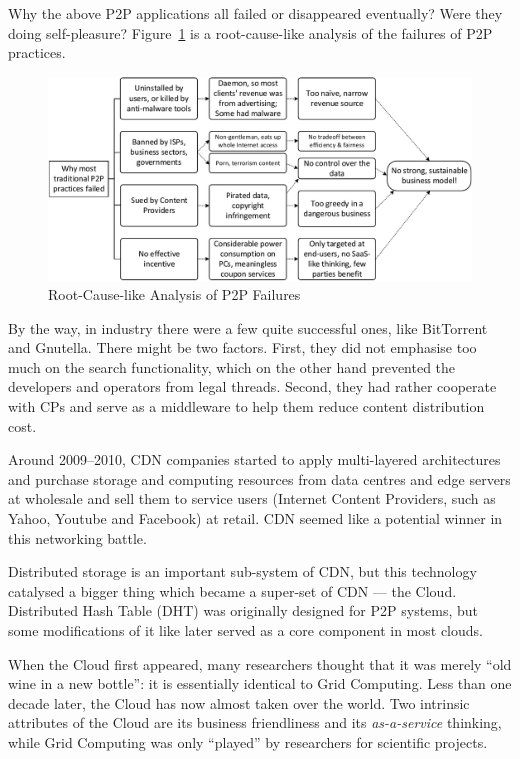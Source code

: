 Why the above P2P applications all failed or disappeared eventually? Were they doing self-pleasure? Figure~\ref{fig:p2p-fail-root} is a root-cause-like analysis of the failures of P2P practices. 
\begin{figure}[ht]
	\centering
	\includegraphics[width=1.00\textwidth]{fig/his-analysis/p2p_fail_analysis.pdf}
	\caption{Root-Cause-like Analysis of P2P Failures}\label{fig:p2p-fail-root}
\end{figure}

By the way, in industry there were a few quite successful ones, like BitTorrent and Gnutella. There might be two factors. First, they did not emphasise too much on the search functionality, which on the other hand prevented the developers and operators from legal threads. Second, they had rather cooperate with CPs and serve as a middleware to help them reduce content distribution cost. 

Around 2009--2010, CDN companies started to apply multi-layered architectures and purchase storage and computing resources from data centres and edge servers at wholesale and sell them to service users (Internet Content Providers, such as Yahoo, Youtube and Facebook) at retail. CDN seemed like a potential winner in this networking battle. 

Distributed storage is an important sub-system of CDN, but this technology catalysed a bigger thing which became a super-set of CDN --- the Cloud. Distributed Hash Table (DHT) was originally designed for P2P systems, but some modifications of it like \cite{DeCandia:2007:Dynamo} later served as a core component in most clouds. 

When the Cloud first appeared, many researchers thought that it was merely ``old wine in a new bottle'': it is essentially identical to Grid Computing. Less than one decade later, the Cloud has now almost taken over the world. Two intrinsic attributes of the Cloud are its business friendliness and its \emph{as-a-service} thinking, while Grid Computing was only ``played'' by researchers for scientific projects. 

